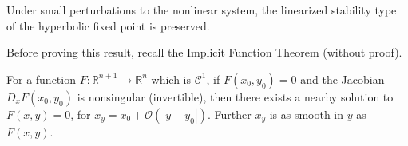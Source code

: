 \begin{proposition}[]
	Under small perturbations to the nonlinear system, the linearized stability type of the hyperbolic fixed point is preserved.
\end{proposition}
Before proving this result, recall the Implicit Function Theorem (without proof).

\begin{theorem}
	For a function $F:\mathbb{R}^{n+1} \to \mathbb{R}^{n}$ which is $\mathcal{C}^1$, if  $F( {x_0} , y_0 ) = 0$ and the Jacobian $D_{{x} }F({x_0} , y_0 )$ is nonsingular (invertible), then there exists a nearby solution to $F({x} , y )=0 $, for ${x_y} = {x_0}  + \mathcal{O}(|y-y_0|)$. Further ${x_y} $ is as smooth in $y$ as $F({x} ,y)$.
\end{theorem}

